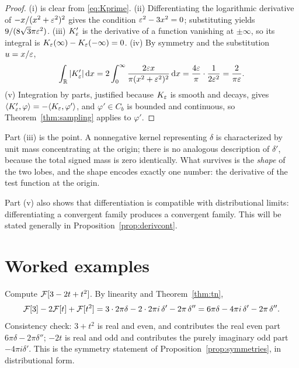 \begin{proof}
(i) is clear from \eqref{eq:Kprime}. (ii) Differentiating the logarithmic derivative of
$-x/(x^{2}+\varepsilon^{2})^{2}$ gives the condition $\varepsilon^{2}-3x^{2}=0$; substituting yields
$9/(8\sqrt3\pi\varepsilon^{2})$. (iii) $K_{\varepsilon}'$ is the derivative of a function vanishing at $\pm\infty$,
so its integral is $K_{\varepsilon}(\infty)-K_{\varepsilon}(-\infty)=0$. (iv) By symmetry and the substitution
$u=x/\varepsilon$,
\begin{equation}
\int_{\mathbb{R}}|K_{\varepsilon}'|\,\mathrm{d} x
=2\int_{0}^{\infty}\frac{2\varepsilon x}{\pi(x^{2}+\varepsilon^{2})^{2}}\,\mathrm{d} x
=\frac{4\varepsilon}{\pi}\cdot\frac{1}{2\varepsilon^{2}}
=\frac{2}{\pi\varepsilon}.
\end{equation}
(v) Integration by parts, justified because $K_{\varepsilon}$ is smooth and decays, gives
$\langle K_{\varepsilon}',\varphi\rangle=-\langle K_{\varepsilon},\varphi'\rangle$, and $\varphi'\in C_{b}$ is bounded and continuous,
so Theorem~\ref{thm:sampling} applies to $\varphi'$.
\end{proof}

Part (iii) is the point. A nonnegative kernel representing $\delta$ is characterized by unit mass
concentrating at the origin; there is no analogous description of $\delta'$, because the total
signed mass is zero identically. What survives is the \emph{shape} of the two lobes, and the shape
encodes exactly one number: the derivative of the test function at the origin.

Part (v) also shows that differentiation is compatible with distributional limits: differentiating a
convergent family produces a convergent family. This will be stated generally in
Proposition~\ref{prop:derivcont}.

\section{Worked examples}

\begin{example}\label{ex:poly1}
Compute $\mathcal{F}[3-2t+t^{2}]$. By linearity and Theorem~\ref{thm:tn},
\begin{equation}
\mathcal{F}[3]-2\mathcal{F}[t]+\mathcal{F}[t^{2}]
=3\cdot2\pi\delta-2\cdot 2\pi i\,\delta'-2\pi\,\delta''
=6\pi\delta-4\pi i\,\delta'-2\pi\,\delta'' .
\end{equation}
Consistency check: $3+t^{2}$ is real and even, and contributes the real even part
$6\pi\delta-2\pi\delta''$; $-2t$ is real and odd and contributes the purely imaginary odd part
$-4\pi i\delta'$. This is the symmetry statement of Proposition~\ref{prop:symmetries}, in
distributional form.
\end{example}

